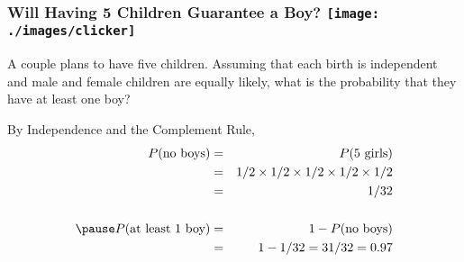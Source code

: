 \begin{frame}
\frametitle{Will Having 5 Children Guarantee a Boy? \hfill \texttt{[image: ./images/clicker]}}
A couple plans to have five children. Assuming that each birth is independent and male and female children are equally likely, what is the probability that they have at least one boy?
\vspace{1em}

\pause
\alert{By Independence and the Complement Rule,}
	\begin{eqnarray*}
		P(\mbox{no boys})&=& P(\mbox{5 girls})\\
							&=& 1/2 \times 1/2 \times 1/2 \times 1/2 \times 1/2\\
							&=&\ 1/32\\ \\ \pause
		P(\mbox{at least 1 boy})&=&1 - P(\mbox{no boys})\\
		&=&1 - 1/32 =31/32 = 0.97
	\end{eqnarray*}

\end{frame}
%
%
